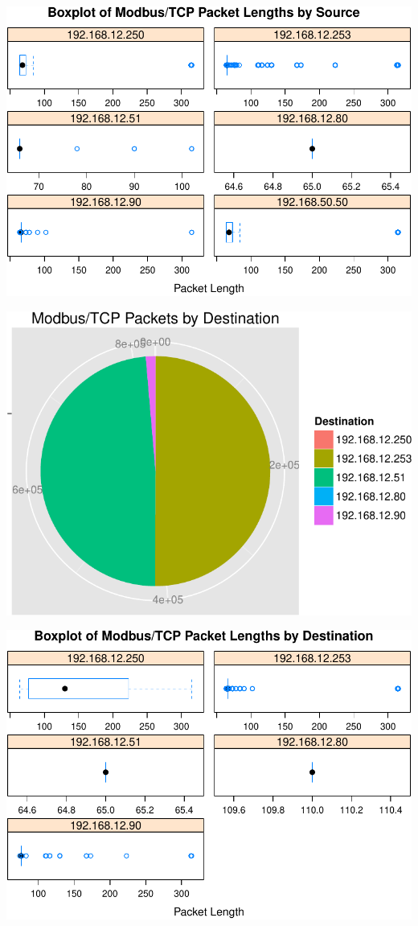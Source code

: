 \documentclass[]{article}
\begin{document}
\includegraphics{edaReport_files/figure-latex/unnamed-chunk-14-1.pdf}

\begin{center}\includegraphics{edaReport_files/figure-latex/unnamed-chunk-15-1} \end{center}

\includegraphics{edaReport_files/figure-latex/unnamed-chunk-16-1.pdf}
\end{document}
